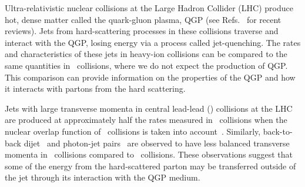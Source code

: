 
Ultra-relativistic nuclear collisions at the Large Hadron Collider (LHC) produce hot, dense matter
called the quark-gluon plasma, QGP (see Refs.~\cite{Roland:2014jsa,Busza:2018rrf} for recent reviews).
Jets from hard-scattering processes in these collisions 
traverse and interact with the QGP, losing energy via a process called jet-quenching. The rates and characteristics of these jets in heavy-ion collisions can be compared to the same quantities in \pp\ collisions, where we do not expect the production of QGP. This comparison can provide information on the properties of the QGP and how it interacts with partons from the hard scattering.

Jets with large transverse momenta in central lead-lead (\pbpb) collisions at the LHC are produced at approximately half the rates measured in \pp\ collisions when the nuclear overlap function of \pbpb\ collisions is taken into account~\cite{Abelev:2013kqa,Aad:2014bxa,Adam:2015ewa,Khachatryan:2016jfl, 2019108}. 
Similarly, back-to-back dijet~\cite{Aad:2010bu,Chatrchyan:2011sx,Aaboud:2017eww} 
and photon-jet pairs~\cite{Chatrchyan:2012gt,Aaboud:2018anc} are observed to have
less balanced transverse momenta in \pbpb\ collisions compared to \pp\ collisions.
These observations suggest that some of the energy from the hard-scattered parton may be
transferred outside of the jet through its interaction with the QGP medium.  

